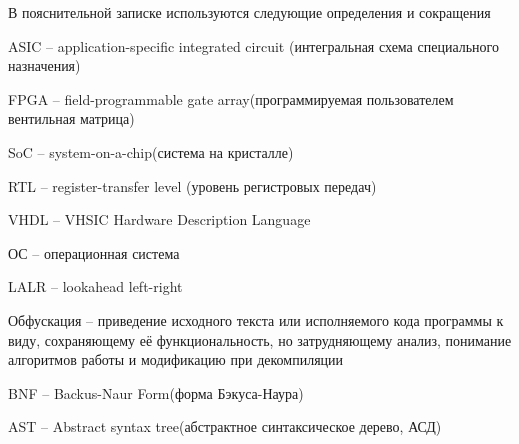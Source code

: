 
В пояснительной записке используются следующие определения и сокращения

ASIC -- application-specific integrated circuit (интегральная схема специального назначения)

FPGA -- field-programmable gate array(программируемая пользователем вентильная матрица)

SoC -- system-on-a-chip(система на кристалле)

RTL -- register-transfer level (уровень регистровых передач)

VHDL -- VHSIC Hardware Description Language

ОС -- операционная система

LALR -- lookahead left-right

Обфускация -- приведение исходного текста или исполняемого кода программы к виду, сохраняющему её функциональность, но затрудняющему анализ, понимание алгоритмов работы и модификацию при декомпиляции

BNF -- Backus-Naur Form(форма Бэкуса-Наура)

AST -- Abstract syntax tree(абстрактное синтаксическое дерево, АСД)